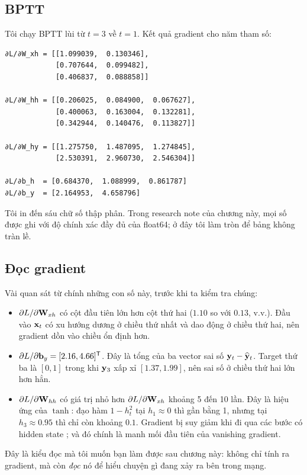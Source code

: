 \subsection{BPTT}

Tôi chạy BPTT lùi từ $t = 3$ về $t = 1$. Kết quả gradient cho năm tham số:

\begin{verbatim}
∂L/∂W_xh = [[1.099039,  0.130346],
            [0.707644,  0.099482],
            [0.406837,  0.088858]]

∂L/∂W_hh = [[0.206025,  0.084900,  0.067627],
            [0.400063,  0.163004,  0.132281],
            [0.342944,  0.140476,  0.113827]]

∂L/∂W_hy = [[1.275750,  1.487095,  1.274845],
            [2.530391,  2.960730,  2.546304]]

∂L/∂b_h  = [0.684370,  1.088999,  0.861787]
∂L/∂b_y  = [2.164953,  4.658796]
\end{verbatim}

Tôi in đến sáu chữ số thập phân. Trong research note của chương này, mọi số
được ghi với độ chính xác đầy đủ của float64; ở đây tôi làm tròn để bảng không
tràn lề.

\subsection{Đọc gradient}

Vài quan sát từ chính những con số này, trước khi ta kiểm tra chúng:

\begin{itemize}
  \item $\partial L / \partial \mathbf{W}_{xh}$ có cột đầu tiên lớn hơn cột thứ
    hai ($1.10$ so với $0.13$, v.v.). Đầu vào $\mathbf{x}_t$ có xu hướng dương
    ở chiều thứ nhất và dao động ở chiều thứ hai, nên gradient dồn vào chiều
    ổn định hơn.
  \item $\partial L / \partial \mathbf{b}_y = [2.16, 4.66]^{\mathsf{T}}$. Đây là
    tổng của ba vector sai số $\mathbf{y}_t - \widehat{\mathbf{y}}_t$. Target thứ
    ba là $[0, 1]$ trong khi $\mathbf{y}_3$ xấp xỉ $[1.37, 1.99]$, nên sai số ở
    chiều thứ hai lớn hơn hẳn.
  \item $\partial L / \partial \mathbf{W}_{hh}$ có giá trị nhỏ hơn
    $\partial L / \partial \mathbf{W}_{xh}$ khoảng 5 đến 10 lần. Đây là hiệu ứng của
    $\tanh$: đạo hàm $1 - h_t^2$ tại $h_1 \approx 0$ thì gần bằng 1, nhưng
    tại $h_3 \approx 0.95$ thì chỉ còn khoảng $0.1$. Gradient bị suy giảm khi
    đi qua các bước có hidden state ; và đó chính là
    manh mối đầu tiên của vanishing gradient.
\end{itemize}

Đây là kiểu đọc mà tôi muốn bạn làm được sau chương này: không chỉ tính ra
gradient, mà còn \emph{đọc} nó để hiểu chuyện gì đang xảy ra bên trong mạng.
